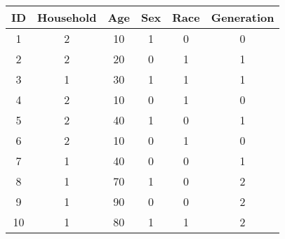 \begin{tabular}{cccccc}
ID & Household & Age & Sex & Race & Generation \\
\hline
\hline
1 & 2 & 10 & 1 & 0 & 0  \\
\hline
2 & 2 & 20 & 0 & 1 & 1  \\
\hline
3 & 1 & 30 & 1 & 1 & 1  \\
\hline
4 & 2 & 10 & 0 & 1 & 0  \\
\hline
5 & 2 & 40 & 1 & 0 & 1  \\
\hline
6 & 2 & 10 & 0 & 1 & 0  \\
\hline
7 & 1 & 40 & 0 & 0 & 1  \\
\hline
8 & 1 & 70 & 1 & 0 & 2  \\
\hline
9 & 1 & 90 & 0 & 0 & 2  \\
\hline
10 & 1 & 80 & 1 & 1 & 2  \\
\hline
\end{tabular}
